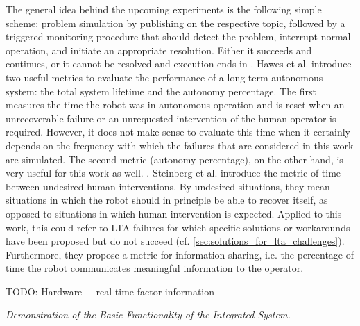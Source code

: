 \documentclass[english, master, utf8]{base/thesis_KBS}
\newcommand{\code}{\collectverb{\codebox}}
\begin{document}
The general idea behind the upcoming experiments is the following simple scheme: problem simulation by publishing on the respective topic, followed by a triggered monitoring
procedure that should detect the problem, interrupt normal operation, and initiate an appropriate resolution. Either it succeeds and \code{NORMAL_OPERATION} continues, or it cannot be
resolved and execution ends in \code{CATASTROPHE}.\newline
Hawes et al. introduce two useful metrics to evaluate the performance of a long-term autonomous system: the total system lifetime and the autonomy percentage. \cite{Hawes:2017} The
first measures the time the robot was in autonomous operation and is reset when an unrecoverable failure or an unrequested intervention of the human operator is required. However,
it does not make sense to evaluate this time when it certainly depends on the frequency with which the failures that are considered in this work are simulated. The second metric
(autonomy percentage), on the other hand, is very useful for this work as well. . \cite{Hawes:2017}
Steinberg et al. \cite{Steinberg:2016} introduce the metric of time between undesired human interventions. By undesired situations, they mean situations in which the robot should
in principle be able to recover itself, as opposed to situations in which human intervention is expected. Applied to this work, this could refer to LTA failures for which specific
solutions or workarounds have been proposed but do not succeed (cf. \ref{sec:solutions_for_lta_challenges}). Furthermore, they propose a metric for information sharing, i.e. the
percentage of time the robot communicates meaningful information to the operator.\newline

TODO: Hardware + real-time factor information\newline

\textit{Demonstration of the Basic Functionality of the Integrated System.}\newline
\end{document}
